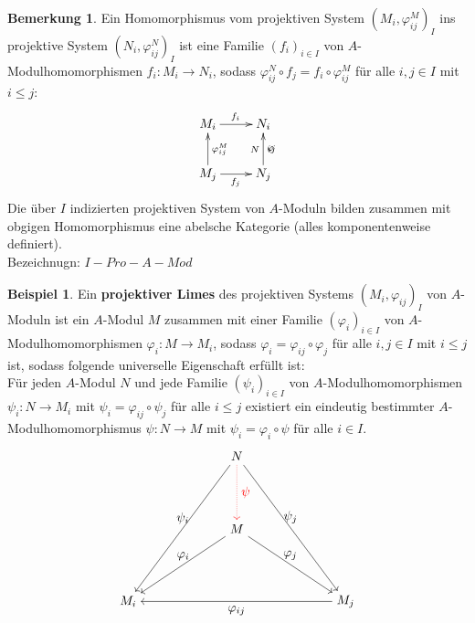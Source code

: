 \documentclass[10pt,a4paper,numbers=endperiod]{scrreprt}
\theoremstyle{definition}
\newtheorem{bem}[satz]{Bemerkung}
\newtheorem{bsp}[satz]{Beispiel}
\begin{document}
\begin{bem}
	Ein Homomorphismus vom projektiven System $(M_i, \varphi_{ij}^M)_I$ ins projektive System $(N_i, \varphi_{ij}^N)_I$ ist eine Familie $(f_i)_{i \in I}$ von $A$-Modulhomomorphismen $f_i: M_i \to N_i$, sodass $\varphi_{ij}^N \circ f_j = f_i \circ \varphi_{ij}^M$ für alle $i, j \in I$ mit $i \leq j$: \begin{align*}
		\begin{xy}
		\xymatrix{
			M_i \ar[r]^{f_i}    &  N_i \\
			M_j\ar[u]_{\varphi_{ij}^M} \ar[r]_{f_j} & N_j \ar[u]_\varphi_{ij}^N
		}
	\end{xy}
	\end{align*}
	Die über $I$ indizierten projektiven System von $A$-Moduln bilden zusammen mit obgigen Homomorphismus eine abelsche Kategorie (alles komponentenweise definiert).\\
	Bezeichnugn: $I-Pro-A-Mod$
\end{bem}

\begin{bsp}
	Ein \textbf{projektiver Limes} des projektiven Systems $(M_i, \varphi_{ij})_I$ von $A$-Moduln ist ein $A$-Modul $M$ zusammen mit einer Familie $(\varphi_i)_{i \in I}$ von $A$-Modulhomomorphismen $\varphi_i: M \to M_i$, sodass $\varphi_i = \varphi_{ij} \circ \varphi_j$ für alle $i, j \in I$ mit $i \leq j$ ist, sodass folgende universelle Eigenschaft erfüllt ist:\\
	Für jeden $A$-Modul $N$ und jede Familie $(\psi_i)_{i \in I}$ von $A$-Modulhomomorphismen $\psi_i: N \to M_i$ mit $\psi_i = \varphi_{ij} \circ \psi_j$ für alle $i \leq j$ existiert ein eindeutig bestimmter $A$-Modulhomomorphismus $\psi: N \to M$ mit $\psi_i = \varphi_i \circ \psi$  für alle $i \in I$. \begin{align*}
	\begin{tikzpicture}{
		\node (01) at (5,6) {$ N $};
		\node (02) at (5,4) {$ M $};
		\node (03) at (2,2) {$ M_i $};
		\node (04) at (8,2) {$ M_j $};
		\draw[->] (01) edge node[above] {$ \psi_i $} (03);
		\draw[->] (01) edge node[above] {$ \psi_j $} (04);
		\draw[->] (02) edge node[above] {$ \varphi_i $} (03);
		\draw[->] (04) edge node[below] {$ \varphi_{ij} $} (03);
		\draw[->] (02) edge node[above] {$ \varphi_j $} (04);
		\draw[red][->, densely dotted] (01) edge node[right] {$ \psi $} (02);
	}
	\end{tikzpicture} 
	\end{align*}
\end{bsp}
\end{document}
